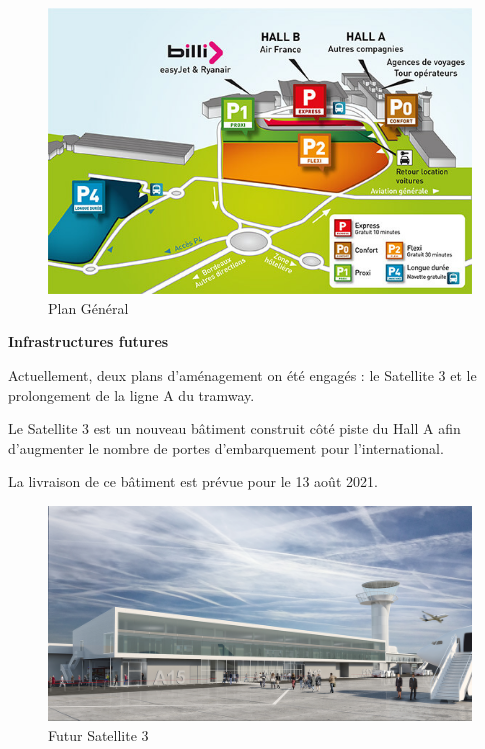\begin{figure}[hbt!]
    \centering
    \includegraphics[width=12cm]{Images/plan.jpg}
    \caption{Plan Général}
    \label{fig:plangeneral}
\end{figure}

\newpage

\textbf{Infrastructures futures}\newline

Actuellement, deux plans d'aménagement on été engagés : le Satellite 3 et le prolongement de la ligne A du tramway.

Le Satellite 3 est un nouveau bâtiment construit côté piste du Hall A afin d'augmenter le nombre de portes d'embarquement pour l'international.

La livraison de ce bâtiment est prévue pour le 13 août 2021.\newline

\begin{figure}[hbt!]
    \centering
    \includegraphics[width=13cm]{Images/satellite3.jpg}
    \caption{Futur Satellite 3}
    \label{fig:sat3}
\end{figure}

